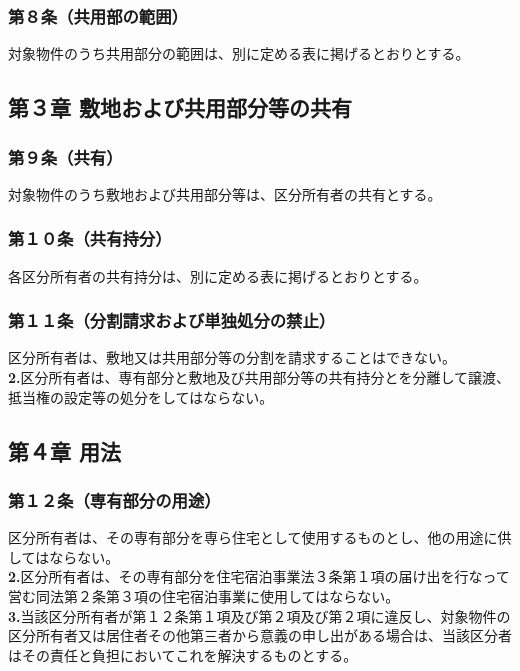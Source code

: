 \documentclass[12pt,uplatex]{jsarticle}
\begin{document}
\subsubsection*{第８条（共用部の範囲）}
対象物件のうち共用部分の範囲は、別に定める表に掲げるとおりとする。

\begin{center}
\subsection*{第３章 敷地および共用部分等の共有}
\end{center}
\subsubsection*{第９条（共有）}
対象物件のうち敷地および共用部分等は、区分所有者の共有とする。
\subsubsection*{第１０条（共有持分）}
各区分所有者の共有持分は、別に定める表に掲げるとおりとする。
\subsubsection*{第１１条（分割請求および単独処分の禁止）}
区分所有者は、敷地又は共用部分等の分割を請求することはできない。\\
\textbf{2.}区分所有者は、専有部分と敷地及び共用部分等の共有持分とを分離して譲渡、抵当権の設定等の処分をしてはならない。

\begin{center}
\subsection*{第４章 用法}
\end{center}
\subsubsection*{第１２条（専有部分の用途）}
区分所有者は、その専有部分を専ら住宅として使用するものとし、他の用途に供してはならない。\\
\textbf{2.}区分所有者は、その専有部分を住宅宿泊事業法３条第１項の届け出を行なって営む同法第２条第３項の住宅宿泊事業に使用してはならない。\\
\textbf{3.}当該区分所有者が第１２条第１項及び第２項及び第２項に違反し、対象物件の区分所有者又は居住者その他第三者から意義の申し出がある場合は、当該区分者はその責任と負担においてこれを解決するものとする。
\end{document}
